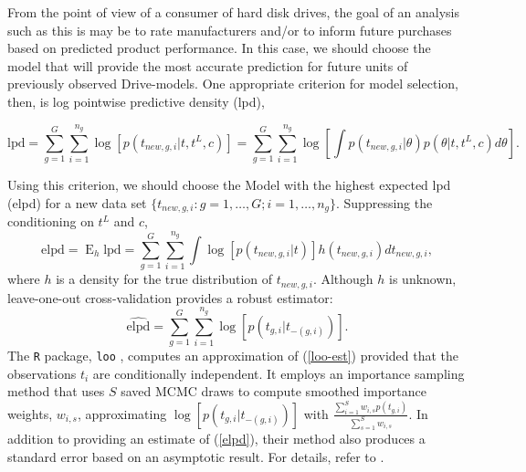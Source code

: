 \documentclass[12pt]{article}
\newcommand{\op}{\operatorname}
\begin{document}
From the point of view of a consumer of hard disk drives, the goal of an analysis such as this is may be to rate manufacturers and/or to inform future purchases based on predicted product performance. In this case, we should choose the model that will provide the most accurate prediction for future units of previously observed Drive-models. One appropriate criterion for model selection, then, is log pointwise predictive density (lpd),

\begin{equation}
\mbox{lpd} = \sum_{g=1}^G \sum_{i=1}^{n_g} \log[p(t_{new,g,i}|t, t^L, c)] = \sum_{g=1}^G \sum_{i=1}^{n_g} \log \left[ \int p(t_{new,g, i}|\theta) p(\theta|t,t^L,c) d\theta \right].
\end{equation}

Using this criterion, we should choose the Model with the highest expected lpd (elpd) for a new data set $\{t_{new,g,i}:g=1,\ldots,G; i=1,\ldots,n_g\}$. Suppressing the conditioning on $t^L$ and $c$,
\begin{equation}
\mbox{elpd} = \op{E}_h \mbox{lpd} = \sum_{g=1}^G \sum_{i=1}^{n_g} \int \log [p(t_{new, g, i}|t)] h(t_{new,g,i}) d t_{new,g,i},
\label{elpd}
\end{equation}
where $h$ is a density for the true distribution of $t_{new,g,i}$. Although $h$ is unknown, leave-one-out cross-validation provides a robust estimator:
\begin{equation}
\widehat{\text{elpd}} = \sum_{g=1}^G \sum_{i=1}^{n_g} \log [p(t_{g,i}|t_{-(g,i)})].
\label{loo-est}
\end{equation}
The \texttt{R} package, \texttt{loo} \citep{loo}, computes an approximation of (\ref{loo-est}) provided that the observations $t_i$ are conditionally independent. It employs an importance sampling method that uses $S$ saved MCMC draws to compute smoothed importance weights, $w_{i,s}$, approximating $\log [p(t_{g,i}|t_{-(g,i)})]$ with $\frac{\sum_{i=1}^S w_{i,s} p(t_{g,i})}{\sum_{s=1}^S w_{i,s}}$. In addition to providing an estimate of (\ref{elpd}), their method also produces a standard error based on an asymptotic result. For details, refer to \cite{vehtari}.
\end{document}

